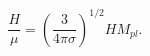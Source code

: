 \begin{equation}
\frac{H}{\mu} = \left( \frac{3}{4\pi\sigma} \right)^{1/2} H M_{pl}.
\end{equation}

